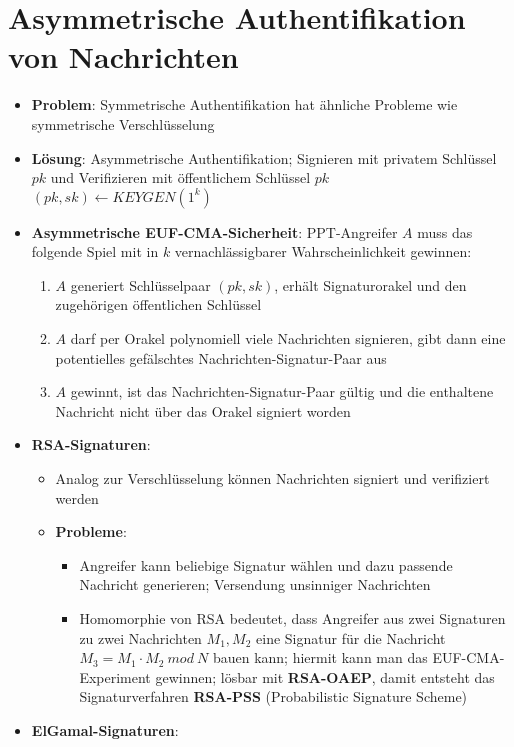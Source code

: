\section{Asymmetrische Authentifikation von Nachrichten}%
\label{asauth:sec:asymmetrische_authentifikation_von_nachrichten}

\begin{itemize}
	\item \textbf{Problem}: Symmetrische Authentifikation hat ähnliche Probleme wie symmetrische Verschlüsselung
	\item \textbf{Lösung}: Asymmetrische Authentifikation; Signieren mit privatem Schlüssel $pk$ und Verifizieren mit öffentlichem Schlüssel $pk$ $(pk, sk) \leftarrow KEYGEN(1^k)$
	\item \textbf{Asymmetrische EUF-CMA-Sicherheit}: PPT-Angreifer $A$ muss das folgende Spiel mit in $k$ vernachlässigbarer Wahrscheinlichkeit gewinnen:
	\begin{enumerate}
		\item $A$ generiert Schlüsselpaar $(pk, sk)$, erhält Signaturorakel und den zugehörigen öffentlichen Schlüssel
		\item $A$ darf per Orakel polynomiell viele Nachrichten signieren, gibt dann eine potentielles gefälschtes Nachrichten-Signatur-Paar aus
		\item $A$ gewinnt, ist das Nachrichten-Signatur-Paar gültig und die enthaltene Nachricht nicht über das Orakel signiert worden
	\end{enumerate}
	\item \textbf{RSA-Signaturen}:
	\begin{itemize}
		\item Analog zur Verschlüsselung können Nachrichten signiert und verifiziert werden
		\item \textbf{Probleme}:
		\begin{itemize}
			\item Angreifer kann beliebige Signatur wählen und dazu passende Nachricht generieren; Versendung unsinniger Nachrichten
			\item Homomorphie von RSA bedeutet, dass Angreifer aus zwei Signaturen zu zwei Nachrichten $M_1, M_2$ eine Signatur für die Nachricht $M_3 = M_1 \cdot M_2\ mod\ N$ bauen kann; hiermit kann man das EUF-CMA-Experiment gewinnen; lösbar mit \textbf{RSA-OAEP}, damit entsteht das Signaturverfahren \textbf{RSA-PSS} (Probabilistic Signature Scheme)
		\end{itemize}
	\end{itemize}
	\item \textbf{ElGamal-Signaturen}:

\end{itemize}
